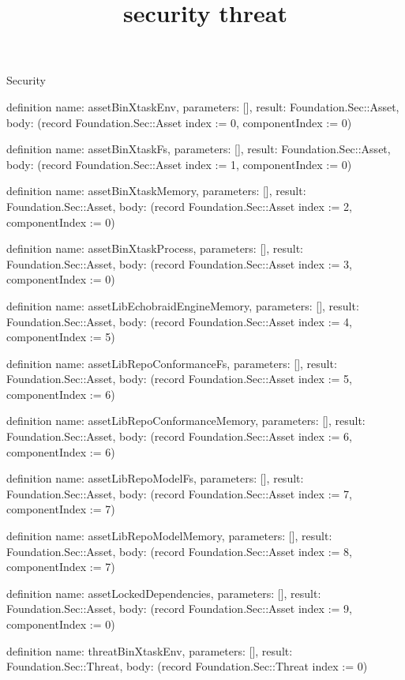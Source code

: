 \begin{lexlean}{Security}
\title{security threat}
\begin{semanticmodule}
definition{
  name: assetBinXtaskEnv,
  parameters: [],
  result: Foundation.Sec::Asset,
  body: (record Foundation.Sec::Asset {index := 0, componentIndex := 0})
}

definition{
  name: assetBinXtaskFs,
  parameters: [],
  result: Foundation.Sec::Asset,
  body: (record Foundation.Sec::Asset {index := 1, componentIndex := 0})
}

definition{
  name: assetBinXtaskMemory,
  parameters: [],
  result: Foundation.Sec::Asset,
  body: (record Foundation.Sec::Asset {index := 2, componentIndex := 0})
}

definition{
  name: assetBinXtaskProcess,
  parameters: [],
  result: Foundation.Sec::Asset,
  body: (record Foundation.Sec::Asset {index := 3, componentIndex := 0})
}

definition{
  name: assetLibEchobraidEngineMemory,
  parameters: [],
  result: Foundation.Sec::Asset,
  body: (record Foundation.Sec::Asset {index := 4, componentIndex := 5})
}

definition{
  name: assetLibRepoConformanceFs,
  parameters: [],
  result: Foundation.Sec::Asset,
  body: (record Foundation.Sec::Asset {index := 5, componentIndex := 6})
}

definition{
  name: assetLibRepoConformanceMemory,
  parameters: [],
  result: Foundation.Sec::Asset,
  body: (record Foundation.Sec::Asset {index := 6, componentIndex := 6})
}

definition{
  name: assetLibRepoModelFs,
  parameters: [],
  result: Foundation.Sec::Asset,
  body: (record Foundation.Sec::Asset {index := 7, componentIndex := 7})
}

definition{
  name: assetLibRepoModelMemory,
  parameters: [],
  result: Foundation.Sec::Asset,
  body: (record Foundation.Sec::Asset {index := 8, componentIndex := 7})
}

definition{
  name: assetLockedDependencies,
  parameters: [],
  result: Foundation.Sec::Asset,
  body: (record Foundation.Sec::Asset {index := 9, componentIndex := 0})
}

definition{
  name: threatBinXtaskEnv,
  parameters: [],
  result: Foundation.Sec::Threat,
  body: (record Foundation.Sec::Threat {index := 0})
}


\end{semanticmodule}
\end{lexlean}
